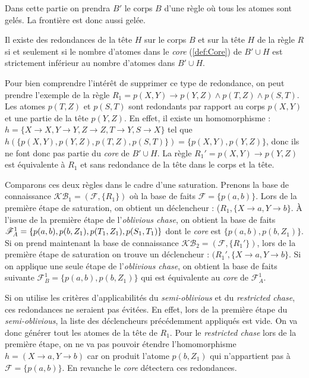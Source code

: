 \par Dans cette partie on prendra $B'$ le corps $B$ d'une règle où tous les atomes sont gelés. La frontière est donc aussi gelée.
\par Il existe des redondances de la tête $H$ sur le corps $B$ et sur la tête $H$ de la règle $R$ si et seulement si le nombre d'atomes dans le \textit{core} (\ref{def:Core}) de $B' \cup H$ est strictement inférieur au nombre d'atomes dans $B' \cup H$. 
\par  Pour bien comprendre l'intérêt de supprimer ce type de redondance, on peut prendre l'exemple de la règle $R_1 = p(X,Y) \rightarrow p(Y,Z) \land p(T,Z) \land p(S,T)$. Les atomes $p(T,Z)$ et $p(S,T)$ sont redondants par rapport au corps $p(X,Y)$ et une partie de la tête $p(Y,Z)$. En effet, il existe un homomorphisme : $h = \{ X \rightarrow X, Y \rightarrow Y, Z \rightarrow Z, T \rightarrow Y, S \rightarrow X \} $ tel que $h(\{p(X, Y), p(Y,Z), p(T,Z), p(S,T)\}) = \{p(X,Y), p(Y,Z)\}$, donc ils ne font donc pas partie du \textit{core} de $B' \cup H$. La règle $R_1' = p(X,Y) \rightarrow p(Y, Z)$ est équivalente à $R_1$ et sans redondance de la tête dans le corps et la tête.
\par Comparons ces deux règles dans le cadre d'une saturation. Prenons la base de connaissance $\mathcal{KB}_1 = (\mathcal{F}, \{R_1\})$ où la base de faits $\mathcal{F} = \{p(a,b)\}$. Lors de la première étape de saturation, on obtient un déclencheur : ($R_1, \{X \rightarrow a, Y \rightarrow b\}$. À l'issue de la première étape de l'\textit{oblivious chase}, on obtient la base de faits $\mathcal{F}^1_A = \{p(a,b), p(b,Z_1),\linebreak p(T_1,Z_1), p(S_1,T_1)\}$ dont le \textit{core} est $\{p(a,b),p(b,Z_1)\}$. Si on prend maintenant la base de connaissance $\mathcal{KB}_2 = (\mathcal{F}, \{R_1'\})$, lors de la première étape de saturation on trouve un déclencheur : $(R_1', \{X \rightarrow a, Y \rightarrow b\}$. Si on applique une seule étape de l'\textit{oblivious chase}, on obtient la base de faits suivante $\mathcal{F}^1_B = \{p(a,b), p(b,Z_1)\}$ qui est équivalente au \textit{core} de $\mathcal{F}^1_A$.
\par Si on utilise les critères d'applicabilités du \textit{semi-oblivious} et du \textit{restricted chase}, ces redondances ne seraient pas évitées. En effet, lors de la première étape du \textit{semi-oblivious}, la liste des déclencheurs précédemment appliqués est vide. On va donc générer tout les atomes de la tête de $R_1$. Pour le \textit{restricted chase} lors de la première étape, on ne va pas pouvoir étendre l'homomorphisme $h = (X \rightarrow a, Y \rightarrow b)$ car on produit l'atome $p(b,Z_1)$ qui n'appartient pas à $\mathcal{F} = \{p(a,b)\}$. En revanche le \textit{core} détectera ces redondances. 



